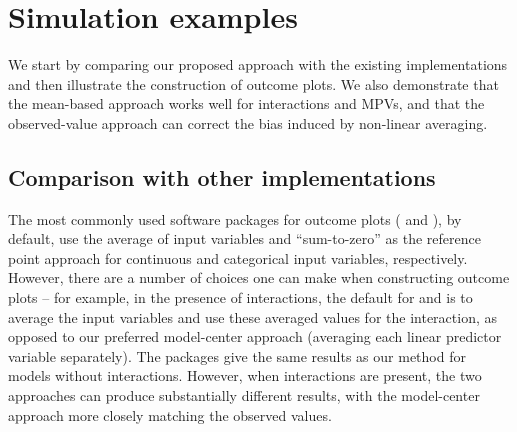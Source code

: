 \section{Simulation examples}

We start by comparing our proposed approach with the existing implementations and then illustrate the construction of outcome plots. We also demonstrate that the mean-based approach works well for interactions and MPVs, and that the observed-value approach can correct the bias induced by non-linear averaging.

\subsection{Comparison with other implementations}

The most commonly used  software packages for outcome plots ( and ), by default, use the average of input variables and ``sum-to-zero'' as the reference point approach for continuous and categorical input variables, respectively. However, there are a number of choices one can make when constructing outcome plots -- for example, in the presence of interactions, the default for  and  is to average the input variables and use these averaged values for the interaction, as opposed to our preferred model-center approach (averaging each linear predictor variable separately). The packages give the same results as our method for models without interactions. However, when interactions are present, the two approaches can produce substantially different results, with the model-center approach more closely matching the observed values.

